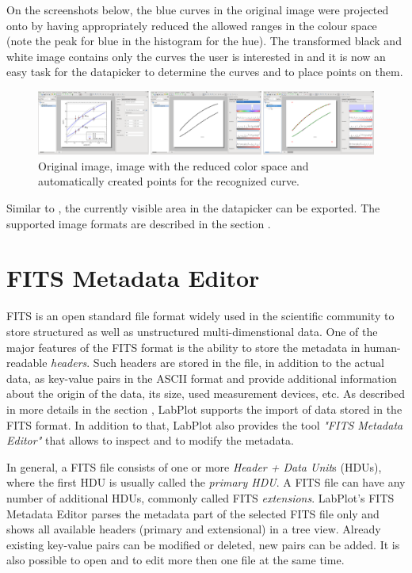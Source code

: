On the screenshots below, the blue curves in the original image were projected onto by having appropriately reduced the allowed ranges in the colour space (note the peak for blue in the histogram for the hue).
The transformed black and white image contains only the curves the user is interested in and it is now an easy task for the datapicker to determine the curves and to place points on them.
\begin{figure}
\includegraphics[width=\textwidth]{images/datapicker_original_transformed_segments.png}
\caption{Original image, image with the reduced color space and automatically created points for the recognized curve.}
\end{figure}

Similar to , the currently visible area in the datapicker can be exported. The supported image formats are described in the section .


\section{FITS Metadata Editor}
FITS is an open standard file format widely used in the scientific community to store structured as well as unstructured multi-dimenstional data. One of the major features of the FITS format is the ability to store the metadata in human-readable \textit{headers}. Such headers are stored in the file, in addition to the actual data, as key-value pairs in the ASCII format and provide additional information about the origin of the data, its size, used measurement devices, etc. As described in more details in the section , LabPlot supports the import of data stored in the FITS format. In addition to that, LabPlot also provides the tool \textit{"FITS Metadata Editor"} that allows to inspect and to modify the metadata.

In general, a FITS file consists of one or more \textit{Header + Data Unit}s (HDUs), where the first HDU is usually called the \textit{primary HDU}. A FITS file can have any number of additional HDUs, commonly called FITS \textit{extensions}. LabPlot's FITS Metadata Editor parses the metadata part of the selected FITS file only and shows all available headers (primary and extensional) in a tree view. Already existing key-value pairs can be modified or deleted, new pairs can be added. It is also possible to open and to edit more then one file at the same time.

